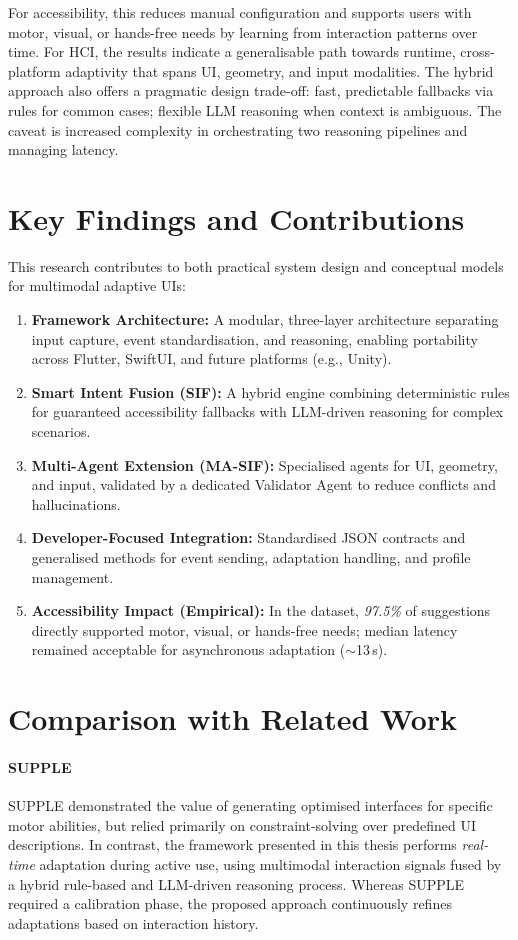 \documentclass[openany]{book}
\begin{document}
For accessibility, this reduces manual configuration and supports users with motor, visual, or hands-free needs by learning from interaction patterns over time. For HCI, the results indicate a generalisable path towards runtime, cross-platform adaptivity that spans UI, geometry, and input modalities. The hybrid approach also offers a pragmatic design trade-off: fast, predictable fallbacks via rules for common cases; flexible LLM reasoning when context is ambiguous. The caveat is increased complexity in orchestrating two reasoning pipelines and managing latency.

\section{Key Findings and Contributions}
This research contributes to both practical system design and conceptual models for multimodal adaptive UIs:
\begin{enumerate}
    \item \textbf{Framework Architecture:} A modular, three-layer architecture separating input capture, event standardisation, and reasoning, enabling portability across Flutter, SwiftUI, and future platforms (e.g., Unity).
    \item \textbf{Smart Intent Fusion (SIF):} A hybrid engine combining deterministic rules for guaranteed accessibility fallbacks with LLM-driven reasoning for complex scenarios.
    \item \textbf{Multi-Agent Extension (MA-SIF):} Specialised agents for UI, geometry, and input, validated by a dedicated Validator Agent to reduce conflicts and hallucinations.
    \item \textbf{Developer-Focused Integration:} Standardised JSON contracts and generalised methods for event sending, adaptation handling, and profile management.
    \item \textbf{Accessibility Impact (Empirical):} In the dataset, \textit{97.5\%} of suggestions directly supported motor, visual, or hands-free needs; median latency remained acceptable for asynchronous adaptation ($\sim$13\,s).
\end{enumerate}

\section{Comparison with Related Work}

\paragraph{SUPPLE \cite{Gajos2008SUPPLE}}
SUPPLE demonstrated the value of generating optimised interfaces for specific motor abilities, but relied primarily on constraint-solving over predefined UI descriptions. In contrast, the framework presented in this thesis performs \emph{real-time} adaptation during active use, using multimodal interaction signals fused by a hybrid rule-based and LLM-driven reasoning process. Whereas SUPPLE required a calibration phase, the proposed approach continuously refines adaptations based on interaction history.
\end{document}
